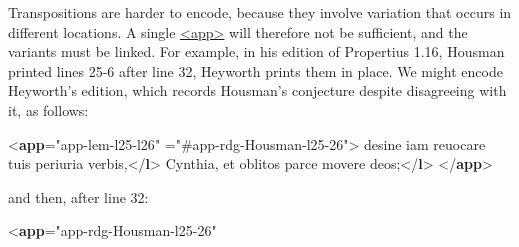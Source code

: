 Transpositions are harder to encode, because they involve variation that occurs in different locations. A single \hyperref[TEI.app]{<app>} will therefore not be sufficient, and the variants must be linked. For example, in his edition of Propertius 1.16, Housman printed lines 25-6 after line 32, Heyworth prints them in place. We might encode Heyworth's edition, which records Housman's conjecture despite disagreeing with it, as follows: \par\bgroup{}\exampleFont \begin{shaded}\noindent\mbox{}{<\textbf{app}\hspace*{1em}{xml:id}="{app-lem-l25-l26}"\mbox{}\newline 
\hspace*{1em}{exclude}="{\#app-rdg-Housman-l25-26}">}\mbox{}\newline 
{}\mbox{}\newline 
\hspace*{1em}desine iam reuocare tuis periuria verbis,{</\textbf{l}>}\mbox{}\newline 
\hspace*{1em}Cynthia, et oblitos parce movere deos;{</\textbf{l}>}\mbox{}\newline 
{}\mbox{}\newline 
{</\textbf{app}>}\end{shaded}\egroup\par \noindent  and then, after line 32: \par\bgroup{}\exampleFont \begin{shaded}\noindent\mbox{}{<\textbf{app}\hspace*{1em}{xml:id}="{app-rdg-Housman-l25-26}"\mbox{}\newline 
}
\end{shaded}
